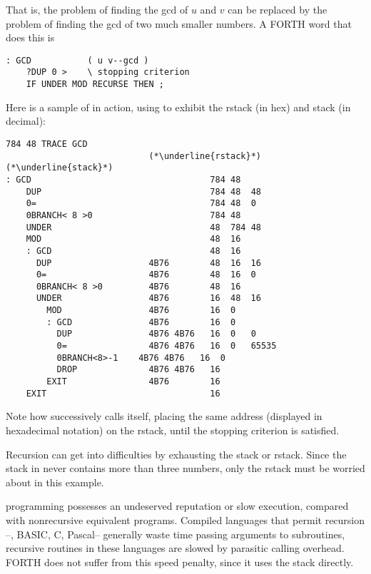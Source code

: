 That is, the problem of finding the gcd of $u$ and $v$ can be replaced by the problem of finding the gcd of two much smaller numbers. A FORTH word that does this is

\begin{lstlisting}
: GCD           ( u v--gcd )
    ?DUP 0 >    \ stopping criterion
    IF UNDER MOD RECURSE THEN ;
\end{lstlisting}

Here is a sample of  in action, using  to exhibit the rstack (in hex) and stack (in decimal):

\begin{lstlisting}
784 48 TRACE GCD
                            (*\underline{rstack}*)       (*\underline{stack}*)
: GCD                                   784 48
    DUP                                 784 48  48
    0=                                  784 48  0
    0BRANCH< 8 >0                       784 48
    UNDER                               48  784 48
    MOD                                 48  16
    : GCD                               48  16
      DUP                   4B76        48  16  16
      0=                    4B76        48  16  0
      0BRANCH< 8 >0         4B76        48  16
      UNDER                 4B76        16  48  16
        MOD                 4B76        16  0
        : GCD               4B76        16  0
          DUP               4B76 4B76   16  0   0
          0=                4B76 4B76   16  0   65535
          0BRANCH<8>-1    4B76 4B76   16  0
          DROP              4B76 4B76   16
        EXIT                4B76        16
    EXIT                                16
\end{lstlisting}

Note how  successively calls itself, placing the same address (displayed in hexadecimal notation) on the rstack, until the stopping criterion is satisfied.

Recursion can get into difficulties by exhausting the stack or rstack. Since the stack in  never contains more than three numbers, only the rstack must be worried about in this example.

 programming possesses an undeserved reputation or slow execution, compared with nonrecursive equivalent programs. Compiled languages that permit recursion --\eg, BASIC, C, Pascal-- generally waste time passing arguments to subroutines, \ie recursive routines in these languages are slowed by parasitic calling overhead. FORTH does not suffer from this speed penalty, since it uses the stack directly.

